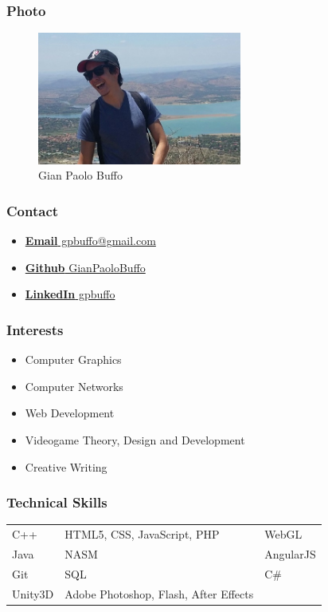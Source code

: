 \documentclass{article}
\begin{document}
\subsubsection{Photo}
\begin{figure}[H]
	\centering
	\includegraphics[width=0.6\textwidth]{../gianpaolo.jpg}
	\caption{Gian Paolo Buffo}
\end{figure}
\subsubsection{Contact}
\begin{itemize}
	\item \href{mailto:gpbuffo@gmail.com}
	{\textbf{Email} gpbuffo@gmail.com}
	\item \href{https://github.com/GianPaoloBuffo}
	{\textbf{Github} GianPaoloBuffo}
	\item \href{https://www.linkedin.com/in/gpbuffo}
	{\textbf{LinkedIn} gpbuffo}
\end{itemize}
\subsubsection{Interests}
\begin{itemize}
	\item Computer Graphics
	\item Computer Networks
	\item Web Development
	\item Videogame Theory, Design and Development
	\item Creative Writing
\end{itemize}
\subsubsection{Technical Skills}
\begin{tabular}{| l | l | l |}
	C++		& HTML5, CSS, JavaScript, PHP	& WebGL    	\\
	Java    & NASM     	& AngularJS							\\
	Git 	& SQL     	& C\#									\\
	Unity3D & Adobe Photoshop, Flash, After Effects &                  
\end{tabular}
\end{document}
